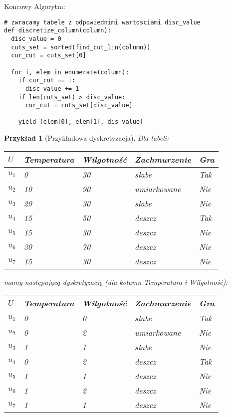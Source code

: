 \documentclass[magisterska]{pracamgr}
\theoremstyle{plain}
\newtheorem{przyklad}[thm]{Przykład}
\theoremstyle{definition}
\theoremstyle{remark}
\begin{document}
Koncowy Algorytm:
\begin{lstlisting}
# zwracamy tabele z odpowiednimi wartosciami disc_value
def discretize_column(column):
  disc_value = 0
  cuts_set = sorted(find_cut_lin(column))
  cur_cut = cuts_set[0]

  for i, elem in enumerate(column):
    if cur_cut == i:
      disc_value += 1
    if len(cuts_set) > disc_value:
      cur_cut = cuts_set[disc_value]

    yield (elem[0], elem[1], dis_value)
\end{lstlisting}
\begin{przyklad}[Przykładowa dyskretyzacja]
Dla tabeli:
\begin{center}
 \begin{tabular}{l || P{2.5cm} P{2.5cm} P{2.5cm} | P{1.5cm}}
  $U$     & Temperatura & Wilgotność & Zachmurzenie & Gra \\ 
  \hline
  $u_{1}$ & 0      & 30      & słabe          & Tak \\
  $u_{2}$ & 10     & 90      & umiarkowane    & Nie \\
  $u_{3}$ & 20     & 30      & słabe   	      & Nie \\
  $u_{4}$ & 15     & 50      & deszcz         & Tak \\
  $u_{5}$ & 15     & 30      & deszcz         & Nie \\
  $u_{6}$ & 30     & 70      & deszcz         & Nie \\
  $u_{7}$ & 15     & 30      & deszcz         & Nie \\
 \end{tabular}
\end{center}
mamy następującą dyskretyzację (dla kolumn Temperatura i Wilgotność):
\begin{center}
 \begin{tabular}{l || P{2.5cm} P{2.5cm} P{2.5cm} | P{1.5cm}}
  $U$     & Temperatura & Wilgotność & Zachmurzenie & Gra \\ 
  \hline
  $u_{1}$ & 0     & 0      & słabe          & Tak \\
  $u_{2}$ & 0     & 2      & umiarkowane    & Nie \\
  $u_{3}$ & 1     & 1      & słabe   	    & Nie \\
  $u_{4}$ & 0     & 2      & deszcz         & Tak \\
  $u_{5}$ & 1     & 1      & deszcz         & Nie \\
  $u_{6}$ & 1     & 2      & deszcz         & Nie \\
  $u_{7}$ & 1     & 1      & deszcz         & Nie \\
 \end{tabular}
\end{center}
\end{przyklad}
\end{document}
